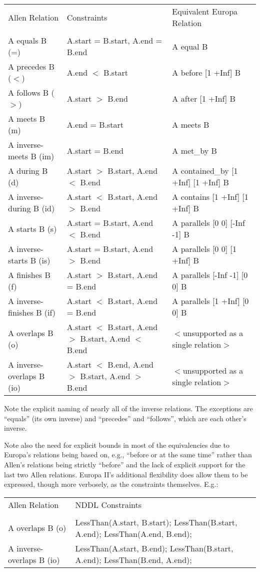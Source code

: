 \documentclass[10pt, letterpaper, twoside]{article}
\begin{document}
\begin{tabular}{lll}
Allen Relation & Constraints & Equivalent Europa Relation \\
\cline{1-3} \\
A equals B (=) & A.start = B.start, A.end = B.end & A equal B \\
A precedes B ($<$) & A.end $<$ B.start & A before [1 +Inf] B \\
A follows B ($>$) & A.start $>$ B.end & A after [1 +Inf] B \\
A meets B (m) & A.end = B.start & A meets B \\
A inverse-meets B (im) & A.start = B.end & A met\_by B \\
A during B (d) & A.start $>$ B.start, A.end $<$ B.end & A contained\_by [1 +Inf] [1 +Inf] B \\
A inverse-during B (id) & A.start $<$ B.start, A.end $>$ B.end & A contains [1 +Inf] [1 +Inf] B \\
A starts B (s) & A.start = B.start, A.end $<$ B.end & A parallels [0 0] [-Inf -1] B \\
A inverse-starts B (is) & A.start = B.start, A.end $>$ B.end & A parallels [0 0] [1 +Inf] B \\
A finishes B (f) & A.start $>$ B.start, A.end = B.end & A parallels [-Inf -1] [0 0] B \\
A inverse-finishes B (if) & A.start $<$ B.start, A.end = B.end & A parallels [1 +Inf] [0 0] B \\
A overlaps B (o) & A.start $<$ B.start, A.end $>$ B.start, A.end $<$ B.end & $<$unsupported as a single relation$>$ \\
A inverse-overlaps B (io) & A.start $<$ B.end, A.end $>$ B.start, A.end $>$ B.end & $<$unsupported as a single relation$>$ \\
\end{tabular}

Note the explicit naming of nearly all of the inverse relations.
The exceptions are ``equals'' (its own inverse) and ``precedes'' and
``follows'', which are each other's inverse.

Note also the need for explicit bounds in most of the equivalencies
due to Europa's relations being based on, e.g., ``before or at the same
time'' rather than Allen's relations being strictly ``before'' and the
lack of explicit support for the last two Allen relations.  Europa
II's additional flexibility does allow them to be expressed, though
more verbosely, as the constraints themselves.  E.g.:

\begin{tabular}{ll}
Allen Relation & NDDL Constraints \\
\cline{1-2} \\
A overlaps B (o) & LessThan(A.start, B.start); LessThan(B.start, A.end); LessThan(A.end, B.end); \\
A inverse-overlaps B (io) & LessThan(A.start, B.end); LessThan(B.start, A.end); LessThan(B.end, A.end); \\
\end{tabular}
\end{document}
